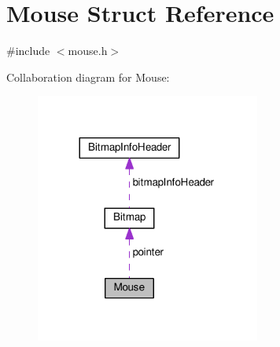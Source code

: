 \hypertarget{structMouse}{}\section{Mouse Struct Reference}
\label{structMouse}


{\ttfamily \#include $<$mouse.\+h$>$}



Collaboration diagram for Mouse\+:\nopagebreak
\begin{figure}[H]
\begin{center}
\leavevmode
\includegraphics[width=209pt]{structMouse__coll__graph}
\end{center}
\end{figure}
